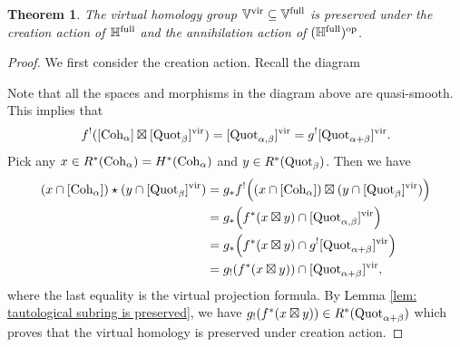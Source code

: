 \documentclass[10pt]{amsart}
\newcommand{\BH}{\mathbb{H}}
\newcommand{\BV}{\mathbb{V}}
\newcommand{\Quot}{\textnormal{Quot}}
\newcommand{\Coh}{\textnormal{Coh}}
\newcommand{\op}{\textnormal{op}}
\newcommand{\+}{{}^+}
\newcommand{\full}{\textnormal{full}}
\newcommand{\vir}{\textnormal{vir}}
\newtheorem{theorem}{Theorem}[section]
\theoremstyle{definition}
\theoremstyle {definition}
\theoremstyle {definition}
\begin{document}
\begin{theorem}\label{thm: virtual homology is preserved}
    The virtual homology group $\BV^\vir\subseteq \BV^\full$ is preserved under the creation action of $\BH^\full$ and the annihilation action of $(\BH^\full)^\op$.
\end{theorem}

\begin{proof}
    We first consider the creation action. Recall the diagram 
    \begin{center}
\end{center}
Note that all the spaces and morphisms in the diagram above are quasi-smooth. This implies that 
$$f^!([\Coh_\alpha]\boxtimes [\Quot_\beta]^\vir)=[\Quot_{\alpha,\beta}]^\vir=g^![\Quot_{\alpha+\beta}]^\vir. 
$$
Pick any $x\in R^*(\Coh_\alpha)=H^*(\Coh_\alpha)$ and $y\in R^*(\Quot_\beta)$. Then we have 
\begin{align*}
    (x\cap [\Coh_\alpha])\star (y\cap [\Quot_\beta]^\vir)
    &=g_*f^!\Big((x\cap [\Coh_\alpha])\boxtimes (y\cap [\Quot_\beta]^\vir)\Big)\\
    &=g_*\Big(f^*(x\boxtimes y)\cap [\Quot_{\alpha,\beta}]^\vir\Big)\\
    &=g_*\Big(f^*(x\boxtimes y)\cap g^![\Quot_{\alpha+\beta}]^\vir\Big)\\
    &=g_!(f^*(x\boxtimes y))\cap [\Quot_{\alpha+\beta}]^\vir, 
\end{align*}
where the last equality is the virtual projection formula. By Lemma \ref{lem: tautological subring is preserved}, we have $g_!(f^*(x\boxtimes y))\in R^*(\Quot_{\alpha+\beta})$ which proves that the virtual homology is preserved under creation action. 


\end{proof}
\end{document}
